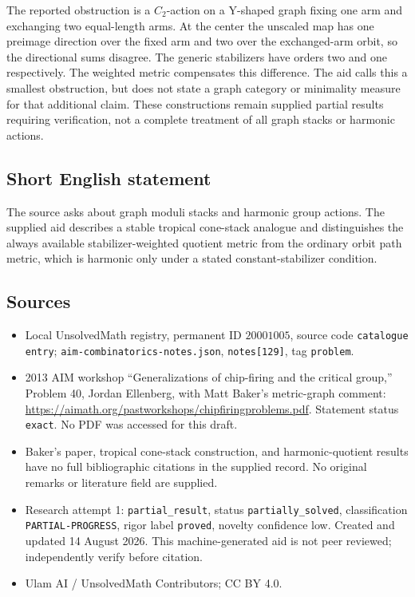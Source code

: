 \documentclass[11pt]{article}
\begin{document}
The reported obstruction is a \(C_2\)-action on a Y-shaped graph fixing one arm and exchanging two equal-length arms. At the center the unscaled map has one preimage direction over the fixed arm and two over the exchanged-arm orbit, so the directional sums disagree. The generic stabilizers have orders two and one respectively. The weighted metric compensates this difference. The aid calls this a smallest obstruction, but does not state a graph category or minimality measure for that additional claim. These constructions remain supplied partial results requiring verification, not a complete treatment of all graph stacks or harmonic actions.
\subsection{Short English statement}
The source asks about graph moduli stacks and harmonic group actions. The supplied aid describes a stable tropical cone-stack analogue and distinguishes the always available stabilizer-weighted quotient metric from the ordinary orbit path metric, which is harmonic only under a stated constant-stabilizer condition.
\subsection{Sources}
\begin{itemize}
\item Local UnsolvedMath registry, permanent ID \(20001005\), source code \texttt{catalogue entry}; \texttt{aim-combinatorics-notes.json}, \texttt{notes[129]}, tag \texttt{problem}.
\item 2013 AIM workshop ``Generalizations of chip-firing and the critical group,'' Problem 40, Jordan Ellenberg, with Matt Baker's metric-graph comment: \url{https://aimath.org/pastworkshops/chipfiringproblems.pdf}. Statement status \texttt{exact}. No PDF was accessed for this draft.
\item Baker's paper, tropical cone-stack construction, and harmonic-quotient results have no full bibliographic citations in the supplied record. No original remarks or literature field are supplied.
\item Research attempt 1: \texttt{partial\_result}, status \texttt{partially\_solved}, classification \texttt{PARTIAL-PROGRESS}, rigor label \texttt{proved}, novelty confidence low. Created and updated 14 August 2026. This machine-generated aid is not peer reviewed; independently verify before citation.
\item Ulam AI / UnsolvedMath Contributors; CC BY 4.0.
\end{itemize}
\end{document}
